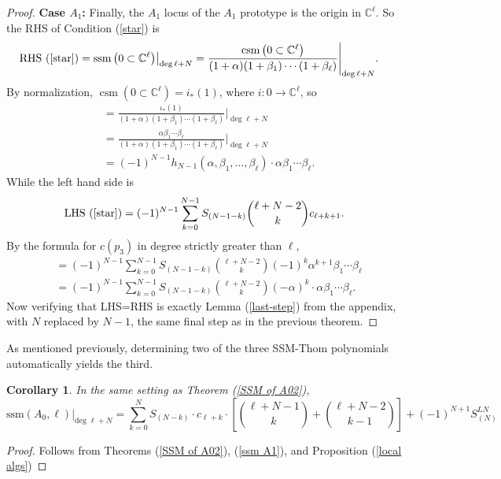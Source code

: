 \documentclass[11pt]{article}
\theoremstyle{plain}
\newtheorem{corollary}[fact]{Corollary}
\theoremstyle{definition}
\theoremstyle{definition}
\newcommand{\C}{\mathbb{C}}
\DeclareMathOperator{\csm}{csm}
\DeclareMathOperator{\ssm}{ssm}
\begin{document}
\begin{proof}
    \textbf{Case $A_1$:} Finally, the $A_1$ locus of the $A_1$ prototype is the origin in $\C^\ell$. So the RHS of Condition (\ref{star}) is 
    \begin{align*}
    \text{RHS (\ref{star}}) = \ssm\big(0\subset \C^\ell\big)\big|_{\deg\ell+N} &= \frac{\csm\left(0\subset \C^\ell\right)}{(1+\alpha)(1+\beta_1)\cdots(1+\beta_\ell)}\Bigg|_{\deg\ell+N}.
    \end{align*}
By normalization, $\csm(0\subset \C^\ell)=i_*(1)$, where $i: 0\to \C^\ell$, so
    \begin{align*}
    &=\frac{\iota_*(1)}{(1+\alpha)(1+\beta_1)\cdots(1+\beta_\ell)}\Bigg|_{\deg\ell+N}\\
    &=\frac{\alpha\beta_1\cdots\beta_\ell}{(1+\alpha)(1+\beta_1)\cdots(1+\beta_\ell)}\Bigg|_{\deg\ell+N}\\
    &=(-1)^{N-1}h_{N-1}(\alpha,\beta_1,\dots,\beta_\ell)\cdot \alpha\beta_1\cdots \beta_\ell.
    \end{align*}
While the left hand side is 
    \begin{align*}
        \text{LHS (\ref{star})} = (-1)^{N-1}\sum_{k=0}^{N-1}S_{(N-1-k)}{\ell+N-2\choose k}c_{\ell+k+1}.
    \end{align*}
By the formula for $c(p_3)$ in degree strictly greater than $\ell$, 
    \begin{align*}
        &=(-1)^{N-1}\sum_{k=0}^{N-1}S_{(N-1-k)}{\ell+N-2\choose k}(-1)^k\alpha^{k+1}\beta_1\cdots\beta_\ell\\
        &=(-1)^{N-1}\sum_{k=0}^{N-1}S_{(N-1-k)}{\ell+N-2\choose k}(-\alpha)^k\cdot \alpha\beta_1\cdots \beta_\ell. 
    \end{align*}
Now verifying that LHS=RHS is exactly Lemma (\ref{last-step}) from the appendix, with $N$ replaced by $N-1$, the same final step as in the previous theorem. 
\end{proof}

As mentioned previously, determining two of the three SSM-Thom polynomials automatically yields the third.

\begin{corollary}\label{ssm A0}
In the same setting as Theorem (\ref{SSM of A02}),
\[
\text{ssm}(A_0,\ell)\Big|_{\text{deg }\ell+N} = \sum_{k=0}^NS_{(N-k)}\cdot c_{\ell+k}\cdot \left[{\ell+N-1\choose k}+{\ell+N-2\choose k-1}\right] 
 + (-1)^{N+1}S^{LN}_{(N)}
 \]
\end{corollary}

\begin{proof}
Follows from Theorems (\ref{SSM of A02}), (\ref{ssm A1}), and Proposition (\ref{local algs})

\end{proof}
\end{document}
